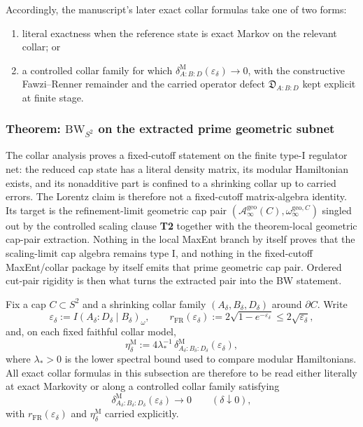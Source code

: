 Accordingly, the manuscript's later exact collar formulas take one of two forms:
\begin{enumerate}
\item literal exactness when the reference state is exact Markov on the relevant collar; or
\item a controlled collar family for which \(\delta^{\mathrm M}_{A:B:D}(\varepsilon_\delta)\to0\), with the constructive Fawzi--Renner remainder and the carried operator defect \(\mathfrak D_{A:B:D}\) kept explicit at finite stage.
\end{enumerate}
\subsubsection{\texorpdfstring{Theorem: \(\mathrm{BW}_{S^2}\) on the extracted prime geometric subnet}{4.2 Theorem: \textbackslash mathrm\{BW\}\_\{S\^{}2\} on the extracted prime geometric subnet}}\label{42-theorem-mathrmbw_s2-from-markov-locality-symmetry-regularity}

The collar analysis proves a fixed-cutoff statement on the finite type-I regulator net: the reduced cap state has a literal density matrix, its modular Hamiltonian exists, and its nonadditive part is confined to a shrinking collar up to carried errors. The Lorentz claim is therefore not a fixed-cutoff matrix-algebra identity. Its target is the refinement-limit geometric cap pair \((\mathcal A_\infty^{\mathrm{geo}}(C),\omega_\infty^{\mathrm{geo},C})\) singled out by the controlled scaling clause \textbf{T2} together with the theorem-local geometric cap-pair extraction. Nothing in the local MaxEnt branch by itself proves that the scaling-limit cap algebra remains type I, and nothing in the fixed-cutoff MaxEnt/collar package by itself emits that prime geometric cap pair. Ordered cut-pair rigidity is then what turns the extracted pair into the BW statement.

Fix a cap \(C\subset S^2\) and a shrinking collar family \((A_\delta,B_\delta,D_\delta)\) around \(\partial C\). Write
\[
\varepsilon_\delta:=I(A_\delta:D_\delta\mid B_\delta)_\omega,
\qquad
r_{\mathrm{FR}}(\varepsilon_\delta):=
2\sqrt{1-e^{-\varepsilon_\delta}}
\le 2\sqrt{\varepsilon_\delta},
\]
and, on each fixed faithful collar model,
\[
\eta_\delta^{\mathrm M}
:=
4\lambda_\ast^{-1}\,
\delta^{\mathrm M}_{A_\delta:B_\delta:D_\delta}(\varepsilon_\delta),
\]
where \(\lambda_\ast>0\) is the lower spectral bound used to compare modular Hamiltonians. All exact collar formulas in this subsection are therefore to be read either literally at exact Markovity or along a controlled collar family satisfying
\[
\delta^{\mathrm M}_{A_\delta:B_\delta:D_\delta}(\varepsilon_\delta)\to 0
\qquad(\delta\downarrow 0),
\]
with \(r_{\mathrm{FR}}(\varepsilon_\delta)\) and \(\eta_\delta^{\mathrm M}\) carried explicitly.

